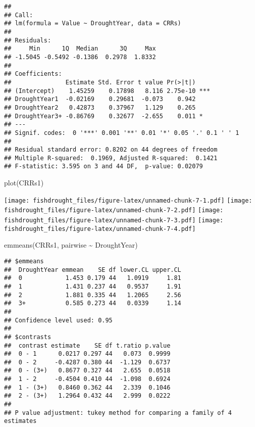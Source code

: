 \documentclass[
]{article}
\newenvironment{Shaded}{\begin{snugshade}}{\end{snugshade}}
\newcommand{\FunctionTok}[1]{\textcolor[rgb]{0.00,0.00,0.00}{#1}}
\newcommand{\NormalTok}[1]{#1}
\newcommand{\SpecialCharTok}[1]{\textcolor[rgb]{0.00,0.00,0.00}{#1}}
\begin{document}
\begin{verbatim}
## 
## Call:
## lm(formula = Value ~ DroughtYear, data = CRRs)
## 
## Residuals:
##     Min      1Q  Median      3Q     Max 
## -1.5045 -0.5492 -0.1386  0.2978  1.8332 
## 
## Coefficients:
##               Estimate Std. Error t value Pr(>|t|)    
## (Intercept)    1.45259    0.17898   8.116 2.75e-10 ***
## DroughtYear1  -0.02169    0.29681  -0.073    0.942    
## DroughtYear2   0.42873    0.37967   1.129    0.265    
## DroughtYear3+ -0.86769    0.32677  -2.655    0.011 *  
## ---
## Signif. codes:  0 '***' 0.001 '**' 0.01 '*' 0.05 '.' 0.1 ' ' 1
## 
## Residual standard error: 0.8202 on 44 degrees of freedom
## Multiple R-squared:  0.1969, Adjusted R-squared:  0.1421 
## F-statistic: 3.595 on 3 and 44 DF,  p-value: 0.02079
\end{verbatim}

\begin{Shaded}
\begin{Highlighting}[]
\FunctionTok{plot}\NormalTok{(CRRs1)}
\end{Highlighting}
\end{Shaded}

\texttt{[image: fishdrought\_files/figure-latex/unnamed-chunk-7-1.pdf]}
\texttt{[image: fishdrought\_files/figure-latex/unnamed-chunk-7-2.pdf]}
\texttt{[image: fishdrought\_files/figure-latex/unnamed-chunk-7-3.pdf]}
\texttt{[image: fishdrought\_files/figure-latex/unnamed-chunk-7-4.pdf]}

\begin{Shaded}
\begin{Highlighting}[]
\FunctionTok{emmeans}\NormalTok{(CRRs1, pairwise }\SpecialCharTok{\textasciitilde{}}\NormalTok{ DroughtYear)}
\end{Highlighting}
\end{Shaded}

\begin{verbatim}
## $emmeans
##  DroughtYear emmean    SE df lower.CL upper.CL
##  0            1.453 0.179 44   1.0919     1.81
##  1            1.431 0.237 44   0.9537     1.91
##  2            1.881 0.335 44   1.2065     2.56
##  3+           0.585 0.273 44   0.0339     1.14
## 
## Confidence level used: 0.95 
## 
## $contrasts
##  contrast estimate    SE df t.ratio p.value
##  0 - 1      0.0217 0.297 44   0.073  0.9999
##  0 - 2     -0.4287 0.380 44  -1.129  0.6737
##  0 - (3+)   0.8677 0.327 44   2.655  0.0518
##  1 - 2     -0.4504 0.410 44  -1.098  0.6924
##  1 - (3+)   0.8460 0.362 44   2.339  0.1046
##  2 - (3+)   1.2964 0.432 44   2.999  0.0222
## 
## P value adjustment: tukey method for comparing a family of 4 estimates
\end{verbatim}
\end{document}
